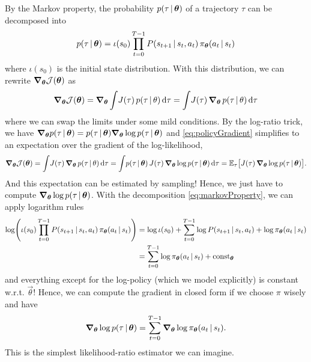 				By the Markov property, the probability \(p(\tau \,\vert\, \bm{\theta})\) of a trajectory \(\tau\) can be decomposed into
				\begin{equation}
					p(\tau \,\vert\, \bm{\theta}) = \iota(s_0) \prod_{t = 0}^{T - 1} P(s_{t + 1} \,\vert\, s_t, a_t) \, \pi_{\bm{\theta}}(a_t \,\vert\, s_t)
					\label{eq:markovProperty}
				\end{equation}
				where \(\iota(s_0)\) is the initial state distribution. With this distribution, we can rewrite \( \grad_{\bm{\theta}} \mathcal{J}(\bm{\theta}) \) as
				\begin{equation}
					\grad_{\bm{\theta}} \mathcal{J}(\bm{\theta})
						= \grad_{\bm{\theta}} \int\! J(\tau) \, p(\tau \,\vert\, \theta) \dd{\tau}
						= \int\! J(\tau) \, \grad_{\bm{\theta}} \, p(\tau \,\vert\, \theta) \dd{\tau}
					\label{eq:policyGradient}
				\end{equation}
				where we can swap the limits under some mild conditions. By the log-ratio trick, we have \( \grad_{\bm{\theta}} p(\tau \,\vert\, \bm{\theta}) = p(\tau \,\vert\, \bm{\theta}) \grad_{\bm{\theta}} \log p(\tau \,\vert\, \bm{\theta}) \) and \eqref{eq:policyGradient} simplifies to an expectation over the gradient of the log-likelihood,
				\begin{equation}
					\grad_{\bm{\theta}} \mathcal{J}(\bm{\theta})
						= \int\! J(\tau) \, \grad_{\bm{\theta}} \, p(\tau \,\vert\, \theta) \dd{\tau}
						= \int\! p(\tau \,\vert\, \bm{\theta}) \, J(\tau) \, \grad_{\bm{\theta}} \log p(\tau \,\vert\, \bm{\theta}) \dd{\tau}
						= \mathbb{E}_\tau\bigl[ J(\tau) \, \grad_{\bm{\theta}} \log p(\tau \,\vert\, \bm{\theta}) \bigr].
					\label{eq:policyGradientExp}
				\end{equation}
				And this expectation can be estimated by sampling! Hence, we just have to compute \( \grad_{\bm{\theta}} \log p(\tau \,\vert\, \bm{\theta}) \). With the decomposition \eqref{eq:markovProperty}, we can apply logarithm rules
				\begin{align}
					\log( \iota(s_0) \prod_{t = 0}^{T - 1} P(s_{t + 1} \,\vert\, s_t, a_t) \, \pi_{\bm{\theta}}(a_t \,\vert\, s_t) )
						&= \log \iota(s_0) + \sum_{t = 0}^{T - 1} \log P(s_{t + 1} \,\vert\, s_t, a_t) + \log \pi_{\bm{\theta}}(a_t \,\vert\, s_t) \\
						&= \sum_{t = 0}^{T - 1} \log \pi_{\bm{\theta}}(a_t \,\vert\, s_t) + \operatorname{const}_{\bm{\theta}}
				\end{align}
				and everything except for the log-policy (which we model explicitly) is constant w.r.t. \(\vec{\theta}\)! Hence, we can compute the gradient in closed form if we choose \(\pi\) wisely and have
				\begin{equation}
					\grad_{\bm{\theta}} \log p(\tau \,\vert\, \bm{\theta}) = \sum_{t = 0}^{T - 1} \grad_{\bm{\theta}} \log \pi_{\bm{\theta}}(a_t \,\vert\, s_t).
					\label{eq:policyGradientSimple}
				\end{equation}
				This is the simplest likelihood-ratio estimator we can imagine.

